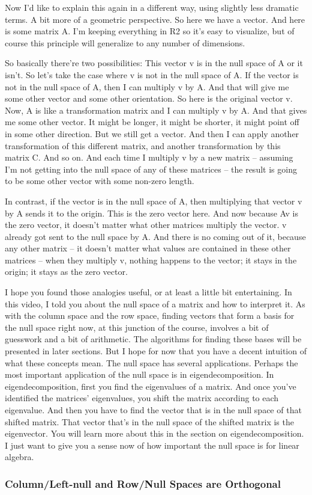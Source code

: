 \documentclass[fleqn,10pt]{olplainarticle}
\theoremstyle{definition}
\theoremstyle{remark}
\begin{document}
Now I'd like to explain this again in a different way, using slightly less dramatic terms. A bit more of a geometric perspective. So here we have a vector. And here is some matrix A. I'm keeping everything in R2 so it's easy to visualize, but of course this principle will generalize to any number of dimensions.

So basically there're two possibilities: This vector v is in the null space of A or it isn't. So let's take the case where v is not in the null space of A. If the vector is not in the null space of A, then I can multiply v by A. And that will give me some other vector and some other orientation. So here is the original vector v. Now, A is like a transformation matrix and I can multiply v by A. And that gives me some other vector. It might be longer, it might be shorter, it might point off in some other direction. But we still get a vector. And then I can apply another transformation of this different matrix, and another transformation by this matrix C. And so on. And each time I multiply v by a new matrix -- assuming I'm not getting into the null space of any of these matrices -- the result is going to be some other vector with some non-zero length.

In contrast, if the vector is in the null space of A, then multiplying that vector v by A sends it to the origin. This is the zero vector here. And now because Av is the zero vector, it doesn't matter what other matrices multiply the vector. v already got sent to the null space by A. And there is no coming out of it, because any other matrix -- it doesn't matter what values are contained in these other matrices -- when they multiply v, nothing happens to the vector; it stays in the origin; it stays as the zero vector.

I hope you found those analogies useful, or at least a little bit entertaining. In this video, I told you about the null space of a matrix and how to interpret it. As with the column space and the row space, finding vectors that form a basis for the null space right now, at this junction of the course, involves a bit of guesswork and a bit of arithmetic. The algorithms for finding these bases will be presented in later sections. But I hope for now that you have a decent intuition of what these concepts mean. The null space has several applications. Perhaps the most important application of the null space is in eigendecomposition. In eigendecomposition, first you find the eigenvalues of a matrix. And once you've identified the matrices' eigenvalues, you shift the matrix according to each eigenvalue. And then you have to find the vector that is in the null space of that shifted matrix. That vector that's in the null space of the shifted matrix is the eigenvector. You will learn more about this in the section on eigendecomposition. I just want to give you a sense now of how important the null space is for linear algebra.

\pagebreak

\subsubsection*{Column/Left-null and Row/Null Spaces are Orthogonal}
\end{document}
